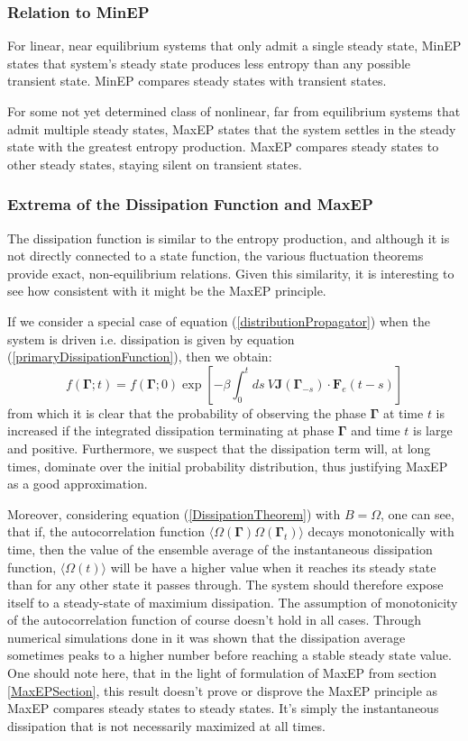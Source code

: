 \documentclass[a4paper,12pt]{article}
\begin{document}
\subsubsection{Relation to MinEP}

For linear, near equilibrium systems that only admit a single steady state, MinEP states that system's steady state produces less entropy than any possible transient state.
MinEP compares steady states with transient states.

For some not yet determined class of nonlinear, far from equilibrium systems that admit multiple steady states, MaxEP states that the system settles in the steady state with the greatest entropy production. MaxEP compares steady states to other steady states, staying silent on transient states.

\subsubsection{Extrema of the Dissipation Function and MaxEP}
The dissipation function is similar to the entropy production, and although it is not directly connected to a state function, the various fluctuation theorems provide exact, non-equilibrium relations. Given this similarity, it is interesting to see how consistent with it might be the MaxEP principle. 

If we consider a special case of equation (\ref{distributionPropagator}) when the system is driven i.e. dissipation is given by equation (\ref{primaryDissipationFunction}), then we obtain:
\begin{equation}
  f(\bm{\Gamma};t)=f(\bm{\Gamma};0)\exp[-\beta \int_0^t ds\ V\bm{J}(\bm{\Gamma}_{-s})\cdot \bm{F}_e(t-s)]
\end{equation}
from which it is clear that the probability of observing the phase $\bm{\Gamma}$ at time $t$ is increased if the integrated dissipation terminating at phase $\bm{\Gamma}$ and time $t$ is large and positive. Furthermore, we suspect that the dissipation term will, at long times, dominate over the initial probability distribution, thus justifying MaxEP as a good approximation.

Moreover, considering equation (\ref{DissipationTheorem}) with $B=\Omega$, one can see, that if, the autocorrelation function $\langle \Omega(\bm{\Gamma})\Omega(\bm{\Gamma}_t)\rangle$ decays monotonically with time, then the value of the ensemble average of the instantaneous dissipation function, $\langle \Omega(t) \rangle$ will be have a higher value when it reaches its steady state than for any other state it passes through. The system should therefore expose itself to a steady-state of maximium dissipation.
The assumption of monotonicity of the autocorrelation function of course doesn't hold in all cases. Through numerical simulations done in \cite{Brookes:2011hu} it was shown that the dissipation average sometimes peaks to a higher number before reaching a stable steady state value. 
One should note here, that in the light of formulation of MaxEP from section \ref{MaxEPSection}, this result doesn't prove or disprove the MaxEP principle as MaxEP compares steady states to steady states.
It's simply the instantaneous dissipation that is not necessarily maximized at all times.
\end{document}
